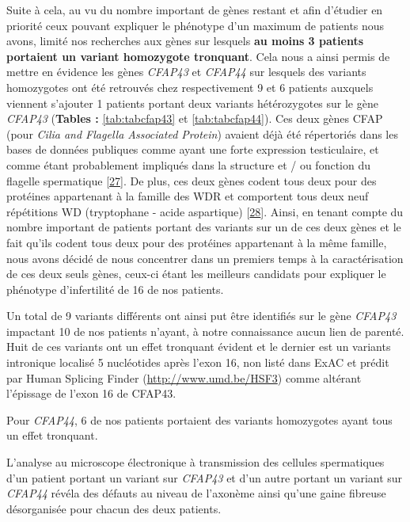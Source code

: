 \documentclass[12pt,twoside]{ugathesis}
\begin{document}
Suite à cela, au vu du nombre important de gènes restant et afin
d'étudier en priorité ceux pouvant expliquer le phénotype d'un maximum
de patients nous avons, limité nos recherches aux gènes sur lesquels
\textbf{au moins 3 patients portaient un variant homozygote tronquant}.
Cela nous a ainsi permis de mettre en évidence les gènes \emph{CFAP43}
et \emph{CFAP44} sur lesquels des variants homozygotes ont été retrouvés
chez respectivement 9 et 6 patients auxquels viennent s'ajouter 1
patients portant deux variants hétérozygotes sur le gène \emph{CFAP43}
(\textbf{Tables : }\ref{tab:tabcfap43} et \ref{tab:tabcfap44}). Ces deux
gènes CFAP (pour \emph{Cilia and Flagella Associated Protein}) avaient
déjà été répertoriés dans les bases de données publiques comme ayant une
forte expression testiculaire, et comme étant probablement impliqués
dans la structure et / ou fonction du flagelle spermatique
{[}\protect\hyperlink{ref-Ivliev2012}{27}{]}. De plus, ces deux gènes
codent tous deux pour des protéines appartenant à la famille des WDR et
comportent tous deux neuf répétitions WD (tryptophane - acide
aspartique) {[}\protect\hyperlink{ref-Smith2008}{28}{]}. Ainsi, en
tenant compte du nombre important de patients portant des variants sur
un de ces deux gènes et le fait qu'ils codent tous deux pour des
protéines appartenant à la même famille, nous avons décidé de nous
concentrer dans un premiers temps à la caractérisation de ces deux seuls
gènes, ceux-ci étant les meilleurs candidats pour expliquer le phénotype
d'infertilité de 16 de nos patients.

Un total de 9 variants différents ont ainsi put être identifiés sur le
gène \emph{CFAP43} impactant 10 de nos patients n'ayant, à notre
connaissance aucun lien de parenté. Huit de ces variants ont un effet
tronquant évident et le dernier est un variants intronique localisé 5
nucléotides après l'exon 16, non listé dans ExAC et prédit par Human
Splicing Finder (\url{http://www.umd.be/HSF3}) comme altérant l'épissage
de l'exon 16 de CFAP43.

Pour \emph{CFAP44}, 6 de nos patients portaient des variants homozygotes
ayant tous un effet tronquant.

L'analyse au microscope électronique à transmission des cellules
spermatiques d'un patient portant un variant sur \emph{CFAP43} et d'un
autre portant un variant sur \emph{CFAP44} révéla des défauts au niveau
de l'axonème ainsi qu'une gaine fibreuse désorganisée pour chacun des
deux patients.
\end{document}
